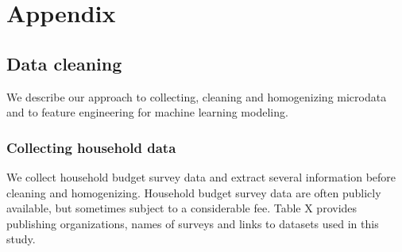 \documentclass[12pt, a4paper]{article}
\begin{document}
\clearpage

\printbibliography

\clearpage

\appendix

\section{Appendix} \label{sec:appendix}

\subsection{Data cleaning} \label{sec:cleaning}

We describe our approach to collecting, cleaning and homogenizing microdata and to feature engineering for machine learning modeling.

\subsubsection{Collecting household data}

We collect household budget survey data and extract several information before cleaning and homogenizing. Household budget survey data are often publicly available, but sometimes subject to a considerable fee. Table X provides publishing organizations, names of surveys and links to datasets used in this study.
\end{document}
